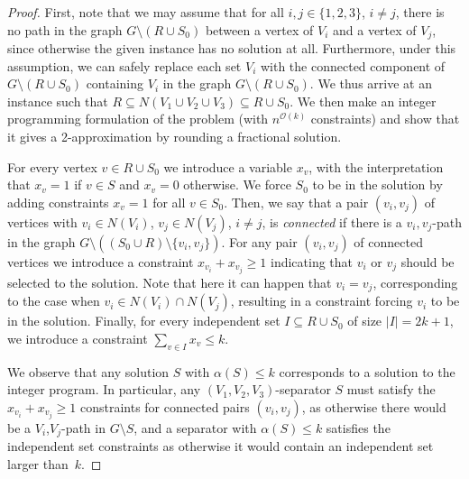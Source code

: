 \documentclass[11pt]{article}
\theoremstyle{definition}
\newcommand{\OO}{\mathcal{O}}
\begin{document}
\begin{proof}
First, note that we may assume that for all $i,j\in \{1,2,3\}$, $i\neq j$, there is no path in the graph $G\setminus (R\cup S_0)$ between a vertex of $V_i$ and a vertex of $V_j$, since otherwise the given instance has no solution at all.
Furthermore, under this assumption, we can safely replace each set $V_i$ with the connected component of $G \setminus (R \cup S_0)$ containing $V_i$ in the graph $G\setminus (R\cup S_0)$.
We thus arrive at an instance such that $R\subseteq N(V_1 \cup V_2 \cup V_3) \subseteq R \cup S_0$.
We then make an integer programming formulation of the problem (with $n^{\OO(k)}$ constraints) and show that it gives a 2-approximation by rounding a fractional solution.

For every vertex $v \in R \cup S_0$ we introduce a variable $x_v$, with the interpretation that $x_v = 1$ if $v \in S$ and $x_v = 0$ otherwise.
We force $S_0$ to be in the solution by adding constraints $x_v = 1$ for all $v \in S_0$.
Then, we say that a pair $(v_i, v_j)$ of vertices with $v_i \in N(V_i)$, $v_j \in N(V_j)$, $i \neq j$, is \emph{connected} if there is a $v_i,v_j$-path in the graph $G \setminus ((S_0 \cup R) \setminus \{v_i, v_j\})$.
For any pair $(v_i, v_j)$ of connected vertices we introduce a constraint $x_{v_i} + x_{v_j} \ge 1$ indicating that $v_i$ or $v_j$ should be selected to the solution.
Note that here it can happen that $v_i = v_j$, corresponding to the case when $v_i \in N(V_i) \cap N(V_j)$, resulting in a constraint forcing $v_i$ to be in the solution.
Finally, for every independent set $I \subseteq R \cup S_0$ of size $|I| = 2k+1$, we introduce a constraint $\sum_{v \in I} x_v \le k$.

We observe that any solution $S$ with $\alpha(S) \le k$ corresponds to a solution to the integer program.
In particular, any $(V_1,V_2,V_3)$-separator $S$ must satisfy the $x_{v_i} + x_{v_j} \ge 1$ constraints for connected pairs $(v_i,v_j)$, as otherwise there would be a $V_i$,$V_j$-path in $G \setminus S$, and a separator with $\alpha(S) \le k$ satisfies the independent set constraints as otherwise it would contain an independent set larger than~$k$.



\end{proof}
\end{document}
